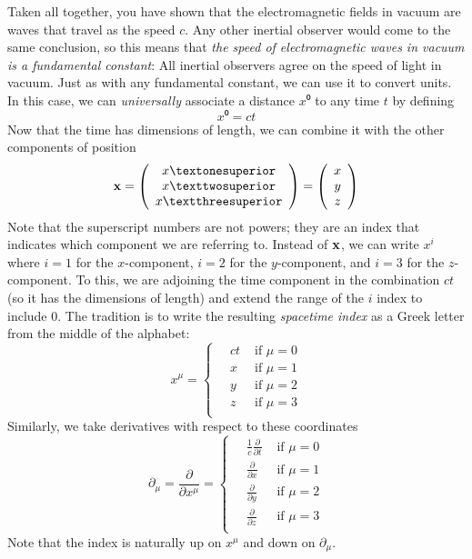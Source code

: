 Taken all together, you have shown that the electromagnetic fields in vacuum are waves that travel as the speed $c$. Any other inertial observer would come to the same conclusion, so this means that {\em the speed of electromagnetic waves in vacuum is a fundamental constant}: All inertial observers agree on the speed of light in vacuum. Just as with any fundamental constant, we can use it to convert units. In this case, we can {\em universally} associate a distance $x⁰$ to any time $t$ by defining 
$$
x⁰ = ct
$$
Now that the time has dimensions of length, we can combine it with the other components of position 
$$
{\bf x} =\left( \begin{array}{c} x¹ \\ x² \\x³\end{array}\right) 
= \left( \begin{array}{c} x \\ y \\ z\end{array}\right) 
$$
Note that the superscript numbers are not powers; they are an index that indicates which component we are referring to. Instead of $\bf x$, we can write $x^i$ where $i=1$ for the $x$-component, $i=2$ for the $y$-component, and $i=3$ for the $z$-component. To this, we are adjoining the time component in the combination $ct$ (so it has the dimensions of length) and extend the range of the $i$ index to include $0$. The tradition is to write the resulting {\em spacetime index} as a Greek letter from the middle of the alphabet: 
$$
x^μ = \begin{cases}
	\quad ct & \textrm{ if } μ = 0\\
	\quad x & \textrm{ if } μ = 1\\
	\quad y & \textrm{ if } μ = 2\\
	\quad z & \textrm{ if } μ = 3\\
\end{cases}
$$
Similarly, we take derivatives with respect to these coordinates 
$$
∂_μ =\frac ∂{∂x^μ} = \begin{cases}
	\quad \frac 1c\frac ∂{∂t} & \textrm{ if } μ = 0\\
	\quad \frac ∂{∂x} & \textrm{ if } μ = 1\\
	\quad \frac ∂{∂y} & \textrm{ if } μ = 2\\
	\quad \frac ∂{∂z} & \textrm{ if } μ = 3\\
\end{cases}
$$
Note that the index is naturally up on $x^μ$ and down on $∂_μ$. 


